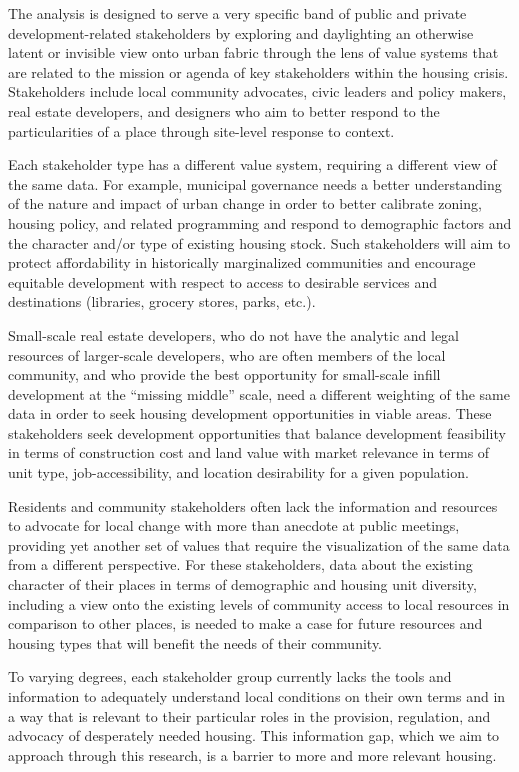 \documentclass[
]{book}
\begin{document}
The analysis is designed to serve a very specific band of public and private development-related stakeholders by exploring and daylighting an otherwise latent or invisible view onto urban fabric through the lens of value systems that are related to the mission or agenda of key stakeholders within the housing crisis. Stakeholders include local community advocates, civic leaders and policy makers, real estate developers, and designers who aim to better respond to the particularities of a place through site-level response to context.

Each stakeholder type has a different value system, requiring a different view of the same data. For example, municipal governance needs a better understanding of the nature and impact of urban change in order to better calibrate zoning, housing policy, and related programming and respond to demographic factors and the character and/or type of existing housing stock. Such stakeholders will aim to protect affordability in historically marginalized communities and encourage equitable development with respect to access to desirable services and destinations (libraries, grocery stores, parks, etc.).

Small-scale real estate developers, who do not have the analytic and legal resources of larger-scale developers, who are often members of the local community, and who provide the best opportunity for small-scale infill development at the ``missing middle'' scale, need a different weighting of the same data in order to seek housing development opportunities in viable areas. These stakeholders seek development opportunities that balance development feasibility in terms of construction cost and land value with market relevance in terms of unit type, job-accessibility, and location desirability for a given population.

Residents and community stakeholders often lack the information and resources to advocate for local change with more than anecdote at public meetings, providing yet another set of values that require the visualization of the same data from a different perspective. For these stakeholders, data about the existing character of their places in terms of demographic and housing unit diversity, including a view onto the existing levels of community access to local resources in comparison to other places, is needed to make a case for future resources and housing types that will benefit the needs of their community.

To varying degrees, each stakeholder group currently lacks the tools and information to adequately understand local conditions on their own terms and in a way that is relevant to their particular roles in the provision, regulation, and advocacy of desperately needed housing. This information gap, which we aim to approach through this research, is a barrier to more and more relevant housing.
\end{document}
